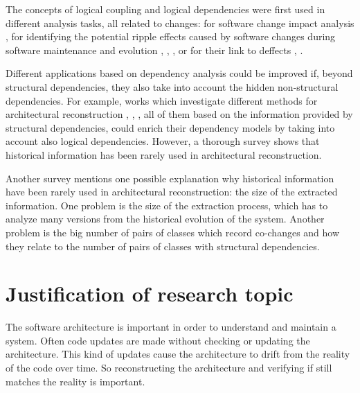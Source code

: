 \documentclass[12pt,a4paper,oneside]{report}
\begin{document}

The concepts of logical coupling and logical dependencies were first used in different analysis tasks, all related to changes: for software change impact analysis \cite{1553643}, for identifying the potential ripple effects caused by software changes during software maintenance and evolution \cite{DBLP:conf/issre/OlivaG15}, \cite{Oliva:2011:ISL:2067853.2068086}, \cite{Poshyvanyk2009}, \cite{posh2010} or for their link to deffects \cite{wiese}, \cite{Zimmermann:2004:MVH:998675.999460}.

Different applications based on dependency analysis could be improved if, beyond structural dependencies, they also take into account the hidden non-structural dependencies. For example, works  which investigate different methods for architectural reconstruction \cite{SoraConti}, \cite{SoraSem13}, \cite{PagerankENASE},  all of them based on the information provided by structural dependencies, could enrich their dependency models by taking into account also logical dependencies. However, a thorough survey \cite{sar} shows that historical information has been rarely used in architectural reconstruction. 

Another survey \cite{Shtern:2012:CMS:2332427.2332428} mentions one possible explanation why historical information have been rarely used in architectural reconstruction: the size of the extracted information. One problem is the size of the extraction process, which has to analyze many versions from the historical evolution of the system. Another problem is the big number of pairs of classes which record co-changes and how they relate to the number of pairs of classes with structural dependencies.


{\let\clearpage\relax \chapter{Justification of research topic}}
The software architecture is important in order to understand and maintain a system. Often code updates are made without checking or updating the architecture. This kind of updates cause the architecture to drift from the reality of the code over time.\cite{sar}
So reconstructing the architecture and verifying if still matches the reality is important. 
\end{document}
